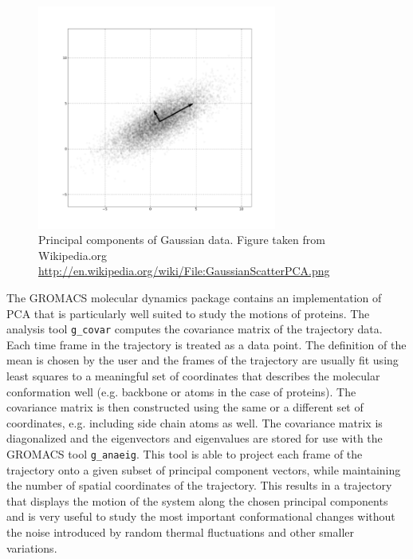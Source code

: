 \documentclass[english, a4paper, 12pt, titlepage, draft]{article}
\begin{document}
\begin{figure}
    \centering
    \includegraphics[width=0.7\textwidth]{figures/GaussianScatterPCA.png}
    \caption{Principal components of Gaussian data. Figure taken from Wikipedia.org \url{http://en.wikipedia.org/wiki/File:GaussianScatterPCA.png}}
    \label{fig:PCA}
\end{figure}         



The GROMACS molecular dynamics package \cite{GROMACS4} contains an implementation of PCA that is particularly well suited to study the motions of proteins.
The analysis tool \texttt{g\_covar} computes the covariance matrix of the trajectory data.
Each time frame in the trajectory is treated as a data point.
The definition of the mean is chosen by the user and the frames of the trajectory are usually fit using least squares to a meaningful set of coordinates that describes the molecular conformation well (e.g. backbone or  atoms in the case of proteins).
The covariance matrix is then constructed using the same or a different set of coordinates, e.g. including side chain atoms as well.
The covariance matrix is diagonalized and the eigenvectors and eigenvalues are stored for use with the GROMACS tool \texttt{g\_anaeig}.
This tool is able to project each frame of the trajectory onto a given subset of principal component vectors, while maintaining the number of spatial coordinates of the trajectory.
This results in a trajectory that displays the motion of the system along the chosen principal components and is very useful to study the most important conformational changes without the noise introduced by random thermal fluctuations and other smaller variations.
\end{document}

